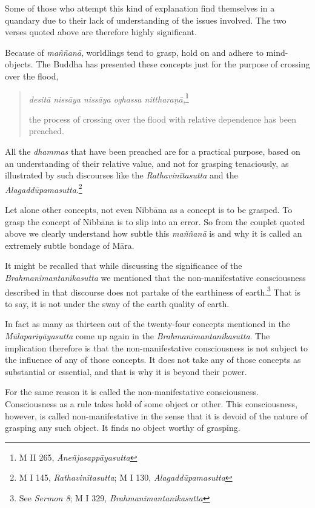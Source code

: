 Some of those who attempt this kind of explanation find themselves in a quandary due to their lack of understanding of the issues involved. The two verses quoted above are therefore highly significant.

Because of \emph{maññanā}, worldlings tend to grasp, hold on and adhere to mind-objects. The Buddha has presented these concepts just for the purpose of crossing over the flood,

\begin{quote}
\emph{desitā nissāya nissāya oghassa nittharaṇā,}\footnote{M II 265, \emph{Āneñjasappāyasutta}}

the process of crossing over the flood with relative dependence has been preached.
\end{quote}

All the \emph{dhammas} that have been preached are for a practical purpose, based on an understanding of their relative value, and not for grasping tenaciously, as illustrated by such discourses like the \emph{Rathavinītasutta} and the \emph{Alagaddūpamasutta}.\footnote{M I 145, \emph{Rathavinītasutta}; M I 130, \emph{Alagaddūpamasutta}}

Let alone other concepts, not even Nibbāna as a concept is to be grasped. To grasp the concept of Nibbāna is to slip into an error. So from the couplet quoted above we clearly understand how subtle this \emph{maññanā} is and why it is called an extremely subtle bondage of Māra.

It might be recalled that while discussing the significance of the \emph{Brahmanimantanikasutta} we mentioned that the non-manifestative consciousness described in that discourse does not partake of the earthiness of earth.\footnote{See \emph{Sermon 8}; M I 329, \emph{Brahmanimantanikasutta}} That is to say, it is not under the sway of the earth quality of earth.

In fact as many as thirteen out of the twenty-four concepts mentioned in the \emph{Mūlapariyāyasutta} come up again in the \emph{Brahmanimantanikasutta}. The implication therefore is that the non-manifestative consciousness is not subject to the influence of any of those concepts. It does not take any of those concepts as substantial or essential, and that is why it is beyond their power.

For the same reason it is called the non-manifestative consciousness. Consciousness as a rule takes hold of some object or other. This consciousness, however, is called non-manifestative in the sense that it is devoid of the nature of grasping any such object. It finds no object worthy of grasping.

